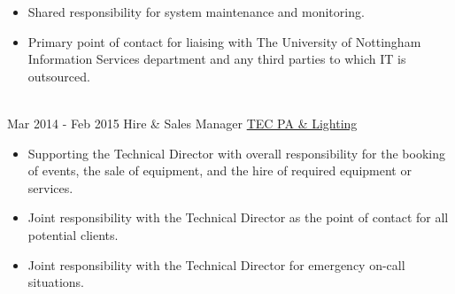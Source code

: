 \documentclass[a4paper]{twentysecondcv} %
\begin{document}
\begin{twenty}
{{\begin{itemize}
        \item Shared responsibility for system maintenance and monitoring.
        \item Primary point of contact for liaising with The University of Nottingham Information Services department and any third parties to which IT is outsourced.
    \end{itemize}}
        }
    \\   
	\twentyitem
    	{Mar 2014 -}
		{Feb 2015}
        {Hire \& Sales Manager}
        {\href{https://www.nottinghamtec.co.uk}{TEC PA \& Lighting}}
        {}
        {
        {
        \begin{itemize}
        \item Supporting the Technical Director with overall responsibility for the booking of events, the sale of equipment, and the hire of required equipment or services.
        \item Joint responsibility with the Technical Director as the point of contact for all potential clients.
        \item Joint responsibility with the Technical Director for emergency on-call situations.
        \end{itemize}
        }
        }
        
\end{twenty}
\end{document}
